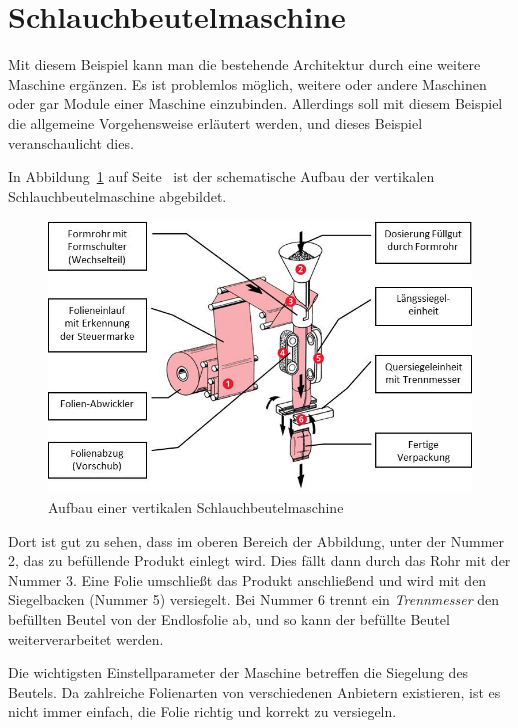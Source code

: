 \section{Schlauchbeutelmaschine}
Mit diesem Beispiel kann man die bestehende Architektur durch eine weitere Maschine ergänzen. Es ist problemlos möglich,
weitere oder andere Maschinen oder gar Module einer Maschine einzubinden. Allerdings soll mit diesem Beispiel die
allgemeine Vorgehensweise erläutert werden, und dieses Beispiel veranschaulicht dies.

In Abbildung~\ref{fig:siegelmaschinen_vffs} auf Seite~\pageref{fig:siegelmaschinen_vffs} ist der schematische Aufbau der
vertikalen Schlauchbeutelmaschine abgebildet.

\begin{figure}[h]
    \centering
    \includegraphics[scale=1]{images/kapitel_5/vffs.jpg}
    \caption{Aufbau einer vertikalen Schlauchbeutelmaschine~\cite{online_grundlagen_boschkwe}}
    \label{fig:siegelmaschinen_vffs}
\end{figure}

Dort ist gut zu sehen, dass im oberen Bereich der Abbildung, unter der Nummer 2, das zu befüllende Produkt einlegt
wird. Dies fällt dann durch das Rohr mit der Nummer 3. Eine Folie umschließt das Produkt anschließend und wird mit den
Siegelbacken (Nummer 5) versiegelt. Bei Nummer 6 trennt ein \textit{Trennmesser} den befüllten Beutel von der
Endlosfolie ab, und so kann der befüllte Beutel weiterverarbeitet werden.

Die wichtigsten Einstellparameter der Maschine betreffen die Siegelung des Beutels. Da zahlreiche Folienarten von
verschiedenen Anbietern existieren, ist es nicht immer einfach, die Folie richtig und korrekt zu versiegeln.

